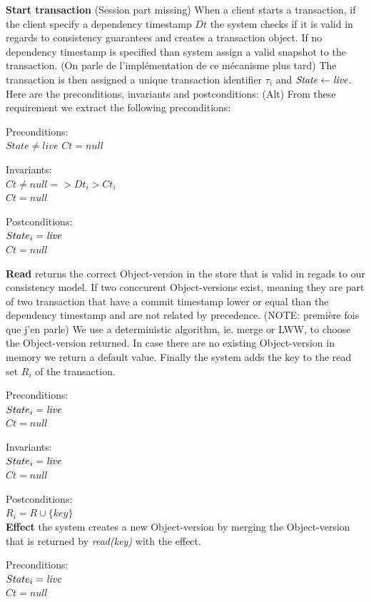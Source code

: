 \documentclass[systeme,french,english]{compas2022}
\begin{document}
\textbf{Start transaction} (Session part missing)
When a client starts a transaction, if the client specify a dependency timestamp $Dt$ the system checks if it is valid in regards to consistency guarantees and creates a transaction object.
If no dependency timestamp is specified than system assign a valid snapshot to the transaction.
(On parle de l'implémentation de ce mécanisme plus tard)
The transaction is then assigned a unique transaction identifier $\tau_i$ and $\emph{State} \leftarrow \emph{live}$.
Here are the preconditions, invariants and postconditions:
(Alt) From these requirement we extract the following preconditions:

Preconditions:\\
$State \neq live$
$Ct = null$

Invariants:\\
\emph{$Ct \neq null => Dt_i > Ct_i$}\\
$Ct = null$

Postconditions:\\
$State_i = \emph{live}$ \\
$Ct = null$


\textbf{Read} returns the correct Object-version in the store that is valid in regads to our consistency model.
If two conccurent Object-versions exist, meaning they are part of two transaction that have a commit timestamp lower or equal than the dependency timestamp and are not related by precedence.
(NOTE: première fois que j'en parle)
We use a deterministic algorithm, ie. merge or LWW, to choose the Object-version returned.
In case there are no existing Object-version in memory we return a default value.
Finally the system adds the key to the read set $R_i$ of the transaction. 

Preconditions:\\ 
$State_i = \emph{live}$ \\
$Ct = null$

Invariants:\\
$State_i = \emph{live}$ \\
$Ct = null$

Postconditions:\\
$R_i = R \cup \{key\}$ \\

\textbf{Effect} the system creates a new Object-version by merging the Object-version that is returned by \emph{read(key)} with the effect.

Preconditions:\\ 
$State_i = \emph{live}$ \\
$Ct = null$
\end{document}
